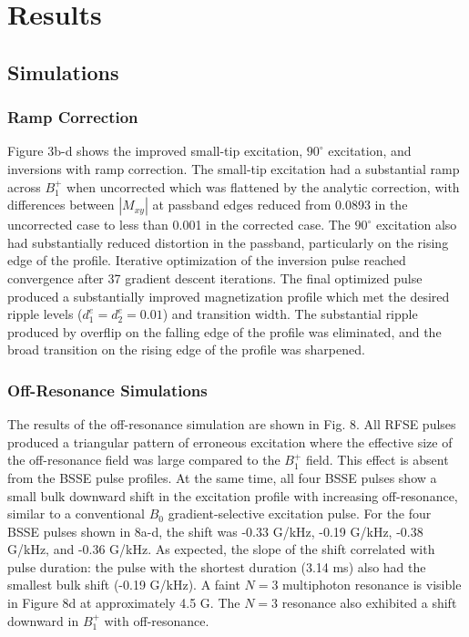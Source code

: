 \documentclass{article}
\begin{document}
\section{Results}
\subsection{Simulations}
\subsubsection{Ramp Correction}
Figure 3b-d shows the improved small-tip excitation, 
$90^\circ$ excitation, and inversions with ramp correction. 
The small-tip excitation had a substantial ramp across $B_1^+$ when uncorrected 
which was flattened by the analytic correction, 
with differences between $|M_{xy}|$ at passband edges reduced from 0.0893 in the uncorrected case to less than 0.001 in the corrected case. 
The $90^\circ$ excitation also had substantially reduced distortion
in the passband, particularly on the rising edge of the profile. 
Iterative optimization of the inversion pulse reached convergence after 37 gradient descent iterations. 
The final optimized pulse produced a substantially improved magnetization profile which met the desired ripple levels ($d_1^e=d_2^e=0.01$) and transition width. 
The substantial ripple produced by overflip on the falling edge of the profile was eliminated, 
and the broad transition on the rising edge of the profile was sharpened. 

\subsubsection{Off-Resonance Simulations}
The results of the off-resonance simulation are shown in Fig. 8. 
All RFSE pulses produced a triangular pattern of erroneous excitation 
where the effective size of the off-resonance field was large compared to the $B_1^+$ field.
This effect is absent from the BSSE pulse profiles. 
At the same time, 
all four BSSE pulses show a small 
bulk downward shift in the excitation profile with increasing off-resonance,
similar to  a conventional $B_0$ gradient-selective excitation pulse. 
For the four BSSE pulses shown in 8a-d, 
the shift was -0.33 G/kHz, -0.19 G/kHz, -0.38 G/kHz, and -0.36 G/kHz. 
As expected, the slope of the shift correlated with pulse duration: 
the pulse with the shortest duration (3.14 ms) also had the smallest bulk shift (-0.19 G/kHz). 
A faint $N=3$ multiphoton resonance is visible in Figure 8d at approximately 4.5 G. 
The $N=3$ resonance also exhibited a shift downward in $B_1^+$ with off-resonance.
\end{document}
